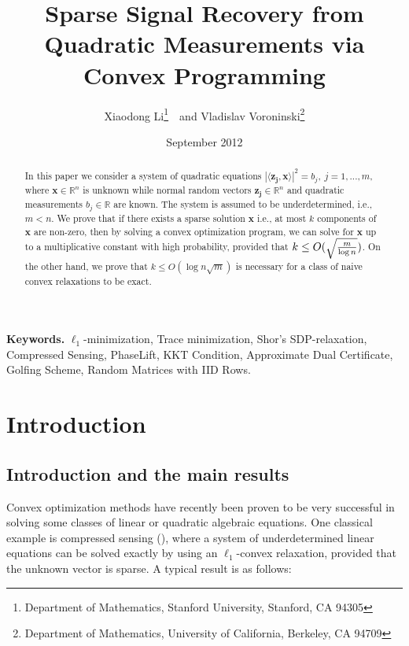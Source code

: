 \documentclass[11pt]{article}
\title{Sparse Signal Recovery from Quadratic Measurements via Convex Programming}
\author{Xiaodong Li\footnote{Department of Mathematics, Stanford University, Stanford, CA 94305
}~~and Vladislav Voroninski\footnote{  Department of Mathematics, University of California, Berkeley, CA 94709
 }
}
\newcommand{\<}{\langle}
\renewcommand{\>}{\rangle}
\newcommand{\vct}[1]{\bm{#1}}
\numberwithin{equation}{section}
\begin{document}
\date{September 2012}
\maketitle

\begin{abstract}
In this paper we consider a system of quadratic equations $|\langle \vct{z_j}, \vct{x}\rangle|^2=b_j, ~j=1,...,m$, where $\vct
{x} \in \mathbb{R}^n$ is unknown while normal random vectors $\vct{z_j} \in \mathbb{R}^n$ and quadratic measurements $b_j \in \mathbb{R}$ are known. The 
system is assumed to be underdetermined, i.e., $m<n$. We prove that if there exists a sparse solution $\vct{x}$ i.e., at most $k$ components of $\vct{x}$ are non-zero, then by solving a convex 
optimization program, we can solve for $\vct{x}$ up to a multiplicative constant with high probability, provided that $k\leq O(\sqrt{m\over{\log 
n}})$. On the other hand, we prove that $k \leq O(\log n\sqrt{m})$ is necessary for a class of naive convex 
relaxations to be exact.
\end{abstract}

{\bf Keywords.} $\ell_1$-minimization, Trace minimization, Shor's SDP-relaxation, Compressed Sensing, PhaseLift, KKT Condition, 
Approximate Dual Certificate, Golfing Scheme, Random Matrices with IID Rows.








\section{Introduction}




\subsection{Introduction and the main results}
Convex optimization methods have recently been proven to be very successful in solving some classes of linear or quadratic algebraic equations. One classical 
example is compressed sensing (\cite{CRT06, Donoho06}), where a system of underdetermined linear 
equations 
can be solved exactly by using an $\ell_1$-convex relaxation, provided that the unknown vector is sparse. A 
typical result is as follows:
\end{document}
